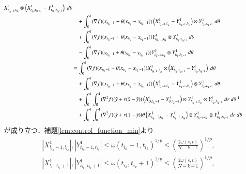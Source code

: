 \begin{prf}
\begin{description}
\begin{align}
						X^1_{t_{i_k-1},t_{i_k}} \otimes \left( X^1_{t_{i_k},t_{i_k+1}} - Y^1_{t_{i_k},t_{i_k+1}} \right)\ d\theta \\
						&\quad + \int_0^1 (\nabla f)( x_{t_{i_k}-1}+\theta ( x_{t_{i_k}}-x_{t_{i_k}-1} ))
						\left( X^1_{t_{i_k-1},t_{i_k}} - Y^1_{t_{i_k-1},t_{i_k}} \right) \otimes Y^1_{t_{i_k},t_{i_k+1}}\ d\theta \\
						&\quad + \int_0^1 (\nabla f)( x_{t_{i_k}-1}+\theta ( x_{t_{i_k}}-x_{t_{i_k}-1} ))
						Y^1_{t_{i_k-1},t_{i_k}} \otimes Y^1_{t_{i_k},t_{i_k+1}}\ d\theta \\
						&\quad - \int_0^1 (\nabla f)( y_{t_{i_k}-1}+\theta ( y_{t_{i_k}}-y_{t_{i_k}-1} ))
						Y^1_{t_{i_k-1},t_{i_k}} \otimes Y^1_{t_{i_k},t_{i_k+1}}\ d\theta \\
					&= \int_0^1 (\nabla f)( x_{t_{i_k}-1}+\theta ( x_{t_{i_k}}-x_{t_{i_k}-1} ))
						X^1_{t_{i_k-1},t_{i_k}} \otimes \left( X^1_{t_{i_k},t_{i_k+1}} - Y^1_{t_{i_k},t_{i_k+1}} \right)\ d\theta \\
						&\quad + \int_0^1 (\nabla f)( x_{t_{i_k}-1}+\theta ( x_{t_{i_k}}-x_{t_{i_k}-1} ))
						\left( X^1_{t_{i_k-1},t_{i_k}} - Y^1_{t_{i_k-1},t_{i_k}} \right) \otimes Y^1_{t_{i_k},t_{i_k+1}}\ d\theta \\
						&\quad + \int_0^1 \int_0^1 (\nabla^2 f)( \tilde{y} + r(\tilde{x} - \tilde{y})) 
						\left( X^1_{0,t_{i_k}-1} - Y^1_{0,t_{i_k}-1} \right) \otimes Y^1_{t_{i_k-1},t_{i_k}} \otimes Y^1_{t_{i_k},t_{i_k+1}}\ dr\ d\theta\ \footnotemark \\
						&\quad + \int_0^1 \int_0^1 (\nabla^2 f)( \tilde{y} + r(\tilde{x} - \tilde{y})) 
						\theta \left( X^1_{t_{i_k}-1,t_{i_k}} - Y^1_{t_{i_k}-1,t_{i_k}} \right) \otimes Y^1_{t_{i_k-1},t_{i_k}} \otimes Y^1_{t_{i_k},t_{i_k+1}}\ dr\ d\theta
				\end{align}
				が成り立つ．補題\ref{lem:control_function_min}より
				\begin{align}
					&\left| X^1_{t_{i_k}-1,t_{i_k}} \right|, \left| Y^1_{t_{i_k}-1,t_{i_k}} \right| \leq \omega(t_{i_k}-1,t_{i_k})^{1/p} \leq \left( \frac{2\omega(s,t)}{N-k-1} \right)^{1/p}, \\
					&\left| X^1_{t_{i_k},t_{i_k}+1} \right|, \left| Y^1_{t_{i_k},t_{i_k}+1} \right| \leq \omega(t_{i_k},t_{i_k}+1)^{1/p} \leq \left( \frac{2\omega(s,t)}{N-k-1} \right)^{1/p}, \\

\end{align}
\end{description}
\end{prf}
